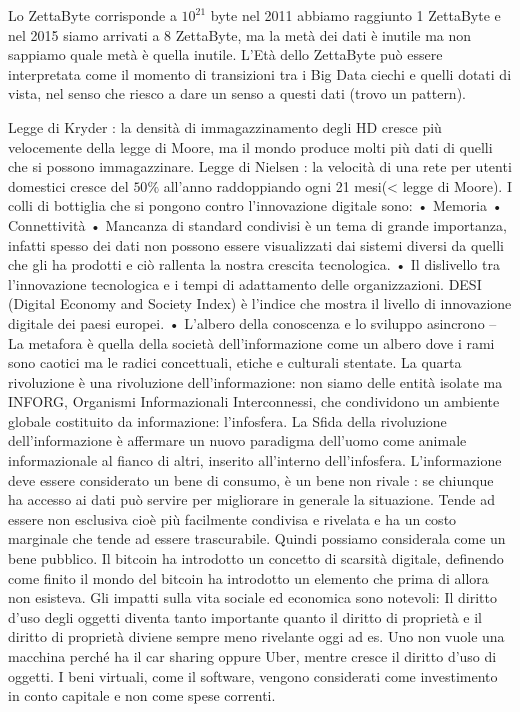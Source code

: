 \documentclass[11pt, a4page, twocolumn]{article}
\begin{document}
Lo ZettaByte corrisponde a $10^21$ byte nel 2011 abbiamo raggiunto 1 ZettaByte e nel 2015 siamo arrivati a 8 ZettaByte, ma la metà dei dati è inutile ma non sappiamo quale metà è quella inutile. L’Età dello ZettaByte può essere interpretata come il momento di transizioni tra i Big Data ciechi e quelli dotati di vista, nel senso che riesco a dare un senso a questi dati (trovo un pattern).

Legge di Kryder : la densità di immagazzinamento degli HD cresce più velocemente della legge di Moore, ma il mondo produce molti più dati di quelli che si possono immagazzinare.
Legge di Nielsen : la velocità di una rete per utenti domestici cresce del $50\%$ all’anno raddoppiando ogni 21 mesi(< legge di Moore).
I colli di bottiglia che si pongono contro l’innovazione digitale sono:
    • Memoria
    • Connettività
    • Mancanza di standard condivisi è un tema di grande importanza, infatti spesso dei dati non possono essere visualizzati dai sistemi diversi da quelli che gli ha prodotti e ciò rallenta la nostra crescita tecnologica. 
    • Il dislivello tra l’innovazione tecnologica e i tempi di adattamento delle organizzazioni. DESI (Digital Economy and Society Index) è l’indice che mostra il livello di innovazione digitale dei paesi europei.
    • L’albero della conoscenza e lo sviluppo asincrono – La metafora è quella della società dell’informazione come un albero dove i rami sono caotici ma le radici concettuali, etiche e culturali stentate.
La quarta rivoluzione è una rivoluzione dell’informazione: non siamo delle entità isolate ma INFORG, Organismi Informazionali Interconnessi, che condividono un ambiente globale costituito da informazione: l’infosfera.
La Sfida della rivoluzione dell’informazione è affermare un nuovo paradigma dell’uomo come animale informazionale al fianco di altri, inserito all’interno dell’infosfera.
L’informazione deve essere considerato un bene di consumo, è un bene non rivale : se chiunque ha accesso ai dati può servire per migliorare in generale la situazione. Tende ad essere non esclusiva cioè più facilmente condivisa e rivelata e ha un costo marginale che tende ad essere trascurabile. Quindi possiamo considerala come un bene pubblico.
Il bitcoin ha introdotto un concetto di scarsità digitale, definendo come finito il mondo del bitcoin ha introdotto un elemento che prima di allora non esisteva.
Gli impatti sulla vita sociale ed economica sono notevoli: Il diritto d’uso degli oggetti diventa tanto importante quanto il diritto di proprietà e il diritto di proprietà diviene sempre meno rivelante oggi ad es. Uno non vuole una macchina perché ha il car sharing oppure Uber, mentre cresce il diritto d’uso di oggetti. I beni virtuali, come il software, vengono considerati come investimento in conto capitale e non come spese correnti.	
\end{document}
